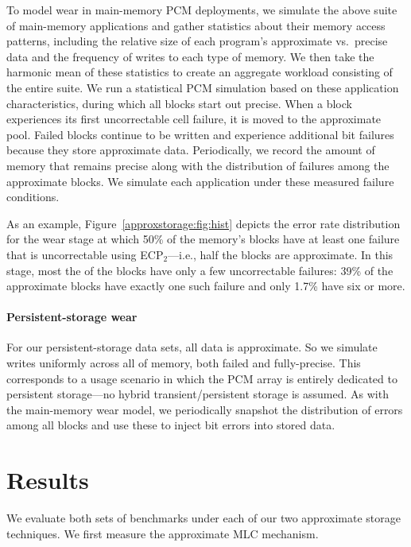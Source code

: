 To model wear in main-memory PCM deployments, we simulate the above suite of main-memory
applications and gather statistics about their memory access patterns,
including the relative size of each program's approximate vs.~precise
data and the frequency of writes to each type of memory. We then take
the harmonic mean of these statistics to create an aggregate workload
consisting of the entire suite. We run a statistical PCM
simulation based on these application characteristics, during which
all blocks start out precise. When a block experiences
its first uncorrectable cell failure, it is moved to the approximate
pool. Failed blocks
continue to be written and experience additional bit failures because they store
approximate data. Periodically, we record the amount of
memory that remains precise along with the distribution of failures
among the approximate blocks.
We simulate each application under these measured failure conditions.

As an example, Figure~\ref{approxstorage:fig:hist} depicts the error rate distribution for the
wear stage at which 50\% of the memory's blocks have at least one failure that
is uncorrectable using ECP$_2$---i.e.,
half the blocks are approximate. In this stage,
most the of the blocks have only a few uncorrectable failures: 39\% of the
approximate blocks have exactly one such failure and only 1.7\% have
six or more.



\paragraph{Persistent-storage wear} For our persistent-storage data sets, all
data is approximate. So we simulate writes uniformly across all of
memory, both failed and fully-precise. This corresponds to a usage scenario in
which the PCM array is entirely dedicated to persistent storage---no hybrid
transient/persistent storage is assumed. As with the main-memory wear model, we
periodically snapshot the distribution of errors among all blocks and use these
to inject bit errors into stored data.


\section{Results}
\label{approxstorage:sec:results}

We evaluate both sets of benchmarks under each of our two approximate storage
techniques.
We first measure the approximate MLC mechanism.

